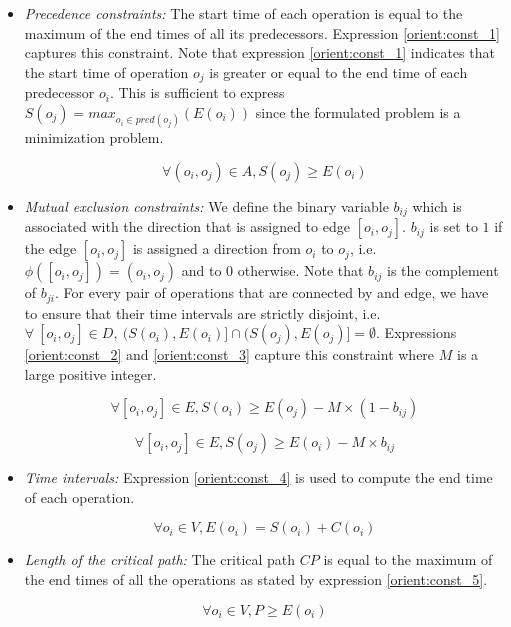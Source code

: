 \begin{itemize}

\item \textit{Precedence constraints:} The start time of each operation is equal to the maximum of the end times of all its predecessors. Expression \ref{orient:const_1} captures this constraint. Note that expression \ref{orient:const_1} indicates that the start time of operation $o_j$ is greater or equal to the end time of each predecessor $o_i$. This is sufficient to express $S(o_j) = max_{o_i \in pred(o_j)}(E(o_i))$ since the formulated problem is a minimization problem.

\begin{equation}
\forall (o_i,o_j) \in A, S(o_j) \geq E(o_i)
\label{orient:const_1}
\end{equation}

\item \textit{Mutual exclusion constraints:} We define the binary variable $b_{ij}$ which is associated with the direction that is assigned to edge $[o_i,o_j]$. $b_{ij}$ is set to $1$ if the edge $[o_i,o_j]$ is assigned a direction from $o_i$ to $o_j$, i.e. $\phi([o_i,o_j]) = (o_i,o_j)$ and to $0$ otherwise. Note that $b_{ij}$ is the complement of $b_{ji}$. For every pair of operations that are connected by and edge, we have to ensure that their time intervals are strictly disjoint, i.e. $\forall\ [o_i,o_j] \in D,\  (S(o_i), E(o_i)] \cap (S(o_j), E(o_j)] = \emptyset$. Expressions \ref{orient:const_2} and \ref{orient:const_3} capture this constraint where $M$ is a large positive integer.

\begin{equation}
\forall [o_i,o_j] \in E, S(o_i) \geq E(o_j) - M \times (1-b_{ij})
\label{orient:const_2}
\end{equation} 

\begin{equation}
\forall [o_i,o_j] \in E, S(o_j) \geq E(o_i) - M \times b_{ij}
\label{orient:const_3}
\end{equation}

\item \textit{Time intervals:} Expression \ref{orient:const_4} is used to compute the end time of each operation.

\begin{equation}
\forall o_i \in V, E(o_i) = S(o_i) + C(o_i)
\label{orient:const_4}
\end{equation} 

\item \textit{Length of the critical path:} The critical path $CP$ is equal to the maximum of the end times of all the operations as stated by expression \ref{orient:const_5}.

\begin{equation}
\forall o_i \in V, P \geq E(o_i)
\label{orient:const_5}
\end{equation}

\end{itemize}

